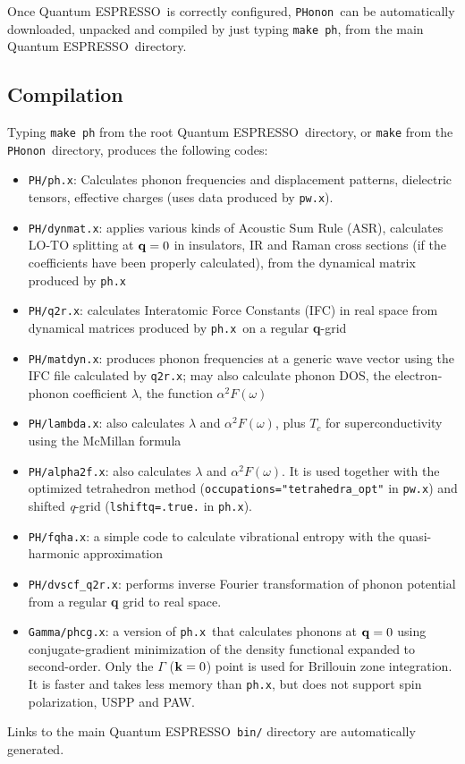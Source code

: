 \documentclass[12pt,a4paper]{article}
\def\qe{{\sc Quantum ESPRESSO}}
\def\pwx{\texttt{pw.x}}
\def\phx{\texttt{ph.x}}
\def\PHonon{\texttt{PHonon}}
\begin{document}
Once \qe\ is correctly configured, \PHonon\ can be automatically
downloaded, unpacked and compiled by
just typing \texttt{make ph}, from the main \qe\ directory.

\subsection{Compilation}

Typing \texttt{make ph} from the root \qe\ directory, or \texttt{make} 
from the \PHonon\ directory, produces the following codes:
\begin{itemize}
  \item \texttt{PH/ph.x}: Calculates phonon frequencies and displacement patterns,
    dielectric tensors, effective charges (uses data produced by \pwx). 
  \item \texttt{PH/dynmat.x}: applies various kinds of Acoustic Sum Rule (ASR),
    calculates LO-TO splitting at ${\bf q} = 0$ in insulators, IR and Raman
    cross sections (if the coefficients have been properly calculated),
    from the dynamical matrix produced by \phx
  \item \texttt{PH/q2r.x}: calculates Interatomic Force Constants (IFC) in real space
    from dynamical matrices produced by \phx\ on a regular {\bf q}-grid 
 \item \texttt{PH/matdyn.x}: produces phonon frequencies at a generic wave vector
    using the IFC file calculated by \texttt{q2r.x}; may also calculate phonon DOS, 
    the electron-phonon coefficient $\lambda$, the function $\alpha^2F(\omega)$
\item \texttt{PH/lambda.x}: also calculates $\lambda$ and $\alpha^2F(\omega)$,
   plus $T_c$ for  superconductivity using the McMillan formula
\item \texttt{PH/alpha2f.x}: also calculates $\lambda$ and $\alpha^2F(\omega)$.
  It is used together with the optimized tetrahedron method
  (\verb|occupations="tetrahedra_opt"| in \pwx) and shifted {\it q}-grid
  (\verb|lshiftq=.true.| in \phx).
\item \texttt{PH/fqha.x}: a simple code to calculate vibrational entropy with
   the quasi-harmonic approximation
\item \texttt{PH/dvscf\_q2r.x}: performs inverse Fourier transformation of phonon
   potential from a regular {\bf q} grid to real space.
\item \texttt{Gamma/phcg.x}:
  a version of \phx\ that calculates phonons at ${\bf q} = 0$ using
  conjugate-gradient minimization of the density functional expanded to
  second-order. Only the $\Gamma$ (${\bf k} = 0$) point is used for
  Brillouin zone integration. It is faster and takes less memory than
  \phx, but does not support spin polarization, USPP and PAW.
\end{itemize}
Links to the main \qe\ \texttt{bin/} directory are automatically generated.
   
\end{document}
